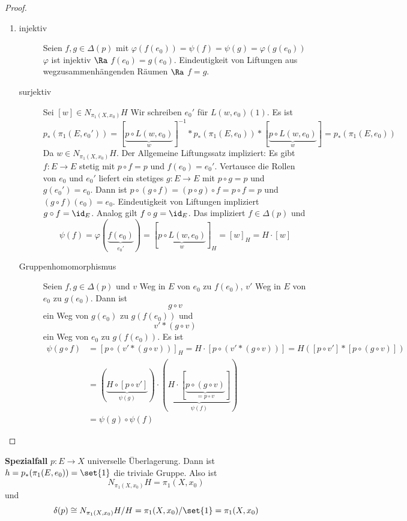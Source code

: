 \documentclass[language=ngerman]{TemplateLecture} %
\begin{document}
\begin{proof}
\begin{enumerate}
        \item \begin{description}
            \item[injektiv] Seien \(f,g \in \Delta(p)\) mit \(\varphi(f(e_0)) = \psi(f) = \psi(g) = \varphi(g(e_0))\) \(\varphi\) ist injektiv \(\Ra\) \(f(e_0) = g(e_0)\). Eindeutigkeit von Liftungen aus wegzusammenhängenden Räumen \(\Ra\) \(f = g\).
            \item[surjektiv] Sei \([w] \in N_{\pi_1(X,x_0)}H\) Wir schreiben \(e_0'\) für \(L(w, e_0)(1)\). Es ist
            \[p_*(\pi_1(E,e_0')) = [\underbrace{p \circ L(w, e_0)}_{w}]^{-1} * p_*(\pi_1(E, e_0)) * [\underbrace{p \circ L(w, e_0)}_{w}] = p_*(\pi_1(E, e_0))\]
            Da \(w \in N_{\pi_1(X,x_0)}H\).
            Der Allgemeine Liftungssatz impliziert: Es gibt \(f\colon E \to E\) stetig mit \( p \circ f = p\) und \(f(e_0) = e_0'\). Vertausce die Rollen von \(e_0\) und \(e_0'\) liefert ein stetiges \(g\colon E\to E\) mit \(p\circ g = p\) und \(g(e_0') = e_0\). Dann ist \(p\circ (g \circ f) = (p\circ g) \circ f = p \circ f = p\) und
            \((g\circ f)(e_0) = e_0\). Eindeutigkeit von Liftungen impliziert \(g \circ f = \id_E\). Analog gilt \(f \circ g = \id_E\).
            Das impliziert \(f \in \Delta(p)\) und
            \[\psi(f) = \varphi(\underbrace{f(e_0)}_{e_0'}) = [\underbrace{p \circ L(w, e_0)}_{w}]_H = [w]_H = H \cdot [w]\]
            \item[Gruppenhomomorphismus] Seien \(f,g \in \Delta(p)\) und \(v\) Weg in \(E\) von \(e_0\) zu \(f(e_0)\), \(v'\) Weg in \(E\) von \(e_0\) zu \(g(e_0)\). Dann ist
            \[g \circ v\]
            ein Weg von \(g(e_0)\) zu \(g(f(e_0))\) und 
            \[v ' * (g\circ v)\]
            ein Weg von \(e_0\) zu \(g(f(e_0))\).
            Es ist
            \[\begin{split}
                \psi(g \circ f) &= [p \circ (v' * (g\circ v))]_H = H\cdot [p\circ(v'* (g\circ v))] = H([p\circ v'] * [p \circ (g\circ v)]) \\
                &= (\underbrace{H\circ [p \circ v']}_{\psi(g)}) \cdot (\underbrace{H \cdot [\underbrace{p \circ(g \circ v)}_{= p \circ v}]}_{\psi(f)}) \\
                &= \psi(g) \circ \psi(f)
            \end{split}\]
        \end{description}
    \end{enumerate}
\end{proof}


\textbf{Spezialfall} \(p \colon E \to X\) universelle Überlagerung. Dann ist \(h = p_*(\pi_1(E, e_0)) = \set{1}\) die triviale Gruppe. Also ist
\[N_{\pi_1(X,x_0)}H = \pi_1(X,x_0)\]
und
\[\delta(p) \cong N_{\pi_1(X,x_0)}H/H = \pi_1(X,x_0)/\set{1} = \pi_1(X,x_0)\]
\end{document}
